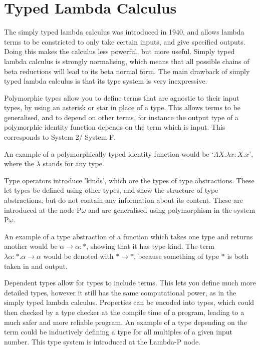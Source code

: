 \documentclass{l4proj}
\begin{document}
\section{Typed Lambda Calculus}

The simply typed lambda calculus was introduced in 1940, and allows lambda terms to be constricted to only take certain inputs, and give specified outputs.  Doing this makes the calculus less powerful, but more useful.  Simply typed lambda calculus is strongly normalising, which means that all possible chains of beta reductions will lead to its beta normal form.  The main drawback of simply typed lambda calculus is that its type system is very inexpressive.

Polymorphic types allow you to define terms that are agnostic to their input types, by using an asterisk or star in place of a type.  This allows terms to be generalised, and to depend on other terms, for instance the output type of a polymorphic identity function depends on the term which is input.  This corresponds to System 2/ System F.

An example of a polymorphically typed identity function would be 
`\texttt{$\Lambda  X . \lambda x : X . x$}', where the $\lambda$ stands for any type.

Type operators introduce 'kinds', which are the types of type abstractions.  These let types be defined using other types, and show the structure of type abstractions, but do not contain any information about its content.  These are introduced at the node P\underline{$\omega$} and are generalised using polymorphism in the system P$\omega$.

An example of a type abstraction of a function which takes one type and returns another would be \texttt{$\alpha \longrightarrow \alpha : * $}, showing that it has type kind.  The term \texttt{ $\lambda \alpha : *  . \alpha \longrightarrow \alpha$} would be denoted with \texttt{$* \longrightarrow *$}, because something of type $*$ is both taken in and output.

Dependent types allow for types to include terms.  This lets you define much more detailed types, however it still has the same computational power, as in the simply typed lambda calculus.  Properties can be encoded into types, which could then checked by a type checker at the compile time of a program, leading to a much safer and more reliable program.  An example of a type depending on the term could be inductively defining a type for all multiples of a given input number.  This type system is introduced at the Lambda-P node.
\end{document}
